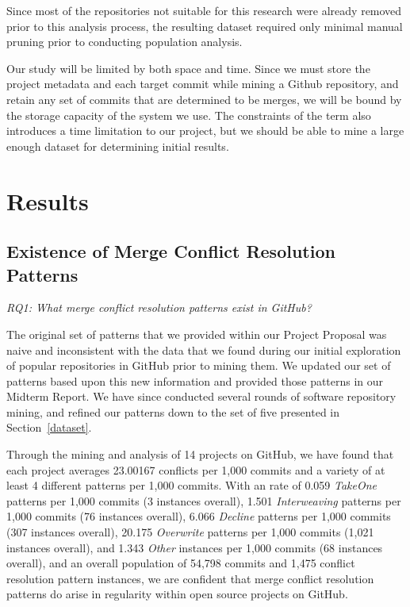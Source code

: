 \documentclass{sig-alternate-05-2015}
\begin{document}
Since most of the repositories not suitable for this research were already removed prior to this analysis process, the resulting dataset required only minimal manual pruning prior to conducting population analysis. 

Our study will be limited by both space and time. Since we must store the project metadata and each target commit while mining a Github repository, and retain any set of commits that are determined to be merges, we will be bound by the storage capacity of the system we use. The constraints of the term also introduces a time limitation to our project, but we should be able to mine a large enough dataset for determining initial results.

\section{Results}\label{Results}
\subsection{Existence of Merge Conflict Resolution Patterns}
\textit{RQ1: What merge conflict resolution patterns exist in GitHub?}

The original set of patterns that we provided within our Project Proposal was naive and inconsistent with the data that we found during our initial exploration of popular repositories in GitHub prior to mining them. We updated our set of patterns based upon this new information and provided those patterns in our Midterm Report. We have since conducted several rounds of software repository mining, and refined our patterns down to the set of five presented in Section~\ref{dataset}.

Through the mining and analysis of 14 projects on GitHub, we have found that each project averages 23.00167 conflicts per 1,000 commits and a variety of at least 4 different patterns per 1,000 commits. With an rate of 0.059 \textit{TakeOne} patterns per 1,000 commits (3 instances overall), 1.501 \textit{Interweaving} patterns per 1,000 commits (76 instances overall), 6.066 \textit{Decline} patterns per 1,000 commits (307 instances overall), 20.175 \textit{Overwrite} patterns per 1,000 commits (1,021 instances overall), and 1.343 \textit{Other} instances per 1,000 commits (68 instances overall), and an overall population of 54,798 commits and 1,475 conflict resolution pattern instances, we are confident that merge conflict resolution patterns do arise in regularity within open source projects on GitHub.
\end{document}
